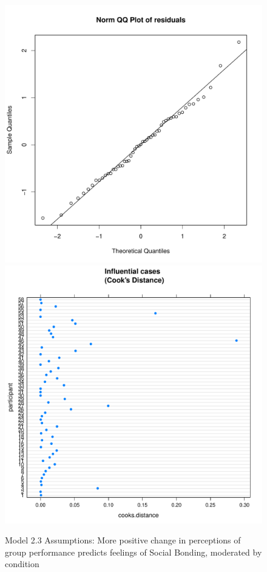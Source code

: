 \begin{figure}[htbp]
    \includegraphics[scale =.4]{images/TEM23QQNorm.pdf}
    \includegraphics[scale =.4]{images/TEM23CooksD.pdf}
    \caption{Model 2.3 Assumptions: More positive change in perceptions of group performance predicts feelings of Social Bonding, moderated by condition}
    \label{fig:M23Assumptions}
\end{figure}













